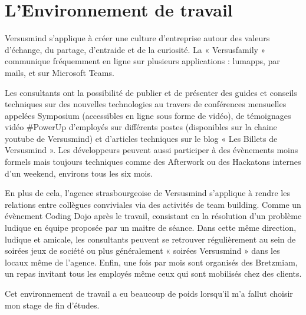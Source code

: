 \documentclass[12pt, a4paper]{report}
\newcommand\tab[1][1cm]{\hspace*{#1}}
\begin{document}
\section{L’Environnement de travail}
\tab{}Versusmind s’applique à créer une culture d’entreprise autour des valeurs d’échange, du partage,
d’entraide et de la curiosité. La « Versusfamily » communique fréquemment en ligne sur plusieurs
applications : lumapps, par mails, et sur Microsoft Teams.\newline

Les consultants ont la possibilité de publier et de présenter des guides et conseils techniques sur des
nouvelles technologies au travers de conférences mensuelles appelées Symposium (accessibles en
ligne sous forme de vidéo), de témoignages vidéo \#PowerUp d’employés sur différents postes
(disponibles sur la chaine youtube de Versusmind) et d’articles techniques sur le blog « Les Billets de
Versusmind ». Les développeurs peuvent aussi participer à des évènements moins formels mais
toujours techniques comme des Afterwork ou des Hackatons internes d’un weekend, environs tous les
six mois.\newline

En plus de cela, l’agence strasbourgeoise de Versusmind s’applique à rendre les relations entre
collègues conviviales via des activités de team building. Comme un évènement Coding Dojo après le
travail, consistant en la résolution d’un problème ludique en équipe proposée par un maitre de séance.
Dans cette même direction, ludique et amicale, les consultants peuvent se retrouver régulièrement au
sein de soirées jeux de société ou plus généralement « soirées Versusmind » dans les locaux même de
l’agence. Enfin, une fois par mois sont organisés des Bretzmiam, un repas invitant tous les employés
même ceux qui sont mobilisés chez des clients.\newline

Cet environnement de travail a eu beaucoup de poids lorsqu’il m’a fallut choisir mon stage de fin d'études.
\end{document}
